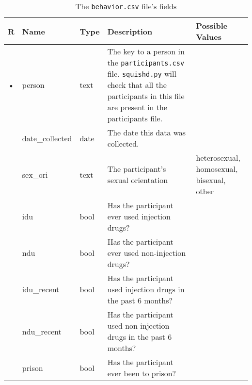 \documentclass{article}
\begin{document}
\begin{table}
  \centering
  \caption{The \texttt{behavior.csv} file's fields}
  \label{tbl:behavior.csv}
  \begin{tabular}{cllp{6cm}p{4cm}}
    R & Name        & Type          & Description & Possible Values\\ \hline
    • & person      & text        &
    The key to a person in the \texttt{participants.csv}
    file. \texttt{squishd.py} will check that all the participants in
    this file are present in the participants file. \\
      & date\_collected & date      & The date this data was collected. \\
      & sex\_ori        & text    & The participant's sexual orientation & heterosexual, homosexual, bisexual, other \\
      & idu             & bool      & Has the participant ever used injection drugs? \\
      & ndu             & bool      & Has the participant ever used non-injection drugs? \\
      & idu\_recent     & bool      & Has the participant used injection drugs in the past 6 months? \\
      & ndu\_recent     & bool      & Has the participant used non-injection drugs in the past 6 months? \\    
      & prison          & bool      & Has the participant ever been to prison? \\
  \end{tabular}
\end{table}
\end{document}

